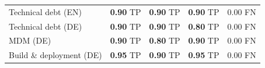 \begin{table}[ht]
\begin{tabular}{p{5cm}cccc}
\midrule
Technical debt (EN)                    & \textbf{0.90} \scriptsize{TP} & \textbf{0.90} \scriptsize{TP} & \textbf{0.90} \scriptsize{TP} & 0.00 \scriptsize{FN} \\
Technical debt (DE)                    & \textbf{0.90} \scriptsize{TP} & \textbf{0.90} \scriptsize{TP} & \textbf{0.80} \scriptsize{TP} & 0.00 \scriptsize{FN} \\
MDM (DE)                               & \textbf{0.90} \scriptsize{TP} & \textbf{0.80} \scriptsize{TP} & \textbf{0.90} \scriptsize{TP} & 0.00 \scriptsize{FN} \\
Build \& deployment (DE)               & \textbf{0.95} \scriptsize{TP} & \textbf{0.90} \scriptsize{TP} & \textbf{0.95} \scriptsize{TP} & 0.00 \scriptsize{FN} \\
\bottomrule
\end{tabular}
\end{table}



